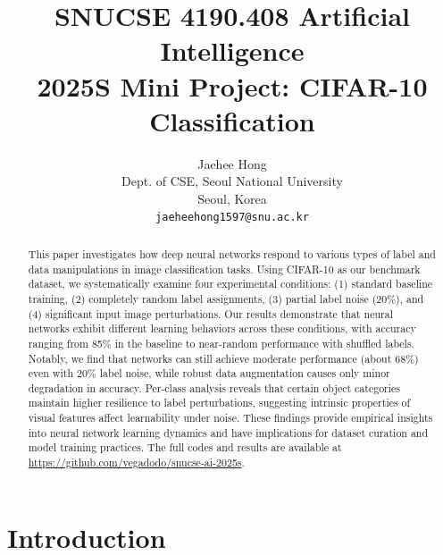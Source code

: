 \documentclass[10pt,twocolumn,letterpaper]{article}
\begin{document}
\title{SNUCSE 4190.408 Artificial Intelligence\\2025S Mini Project: CIFAR-10 Classification}

\author{Jaehee Hong\\
Dept. of CSE, Seoul National University\\
Seoul, Korea\\
{\tt\small jaeheehong1597@snu.ac.kr}
}
\maketitle

\begin{abstract}
   This paper investigates how deep neural networks respond to various types of label and data manipulations in image classification tasks.
   Using CIFAR-10 as our benchmark dataset, we systematically examine four experimental conditions:
   (1) standard baseline training,
   (2) completely random label assignments,
   (3) partial label noise (20\%), and 
   (4) significant input image perturbations.
   Our results demonstrate that neural networks exhibit different learning behaviors across these conditions, with accuracy ranging from 85\% in the baseline to near-random performance with shuffled labels.
   Notably, we find that networks can still achieve moderate performance (about 68\%) even with 20\% label noise, while robust data augmentation causes only minor degradation in accuracy.
   Per-class analysis reveals that certain object categories maintain higher resilience to label perturbations, suggesting intrinsic properties of visual features affect learnability under noise.
   These findings provide empirical insights into neural network learning dynamics and have implications for dataset curation and model training practices.
   The full codes and results are available at \url{https://github.com/vegadodo/snucse-ai-2025s}.
\end{abstract}

\section{Introduction}
\label{sec:intro}
\end{document}
